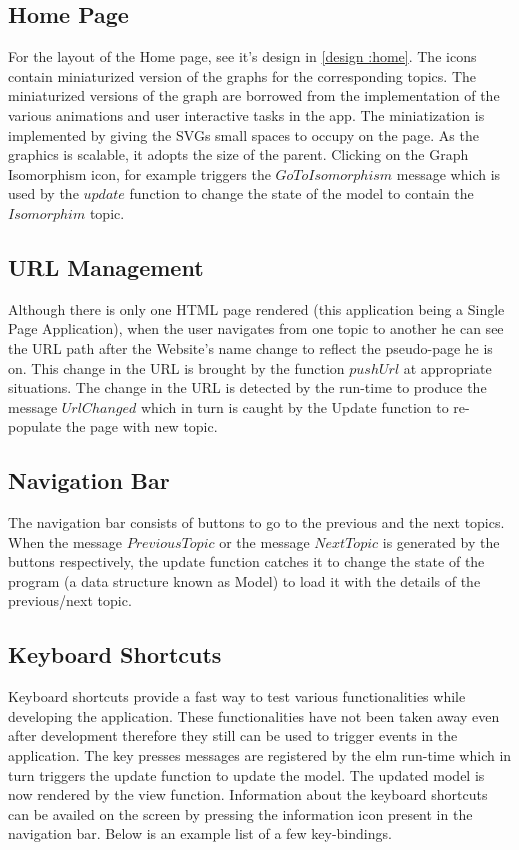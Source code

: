 \subsection{Home Page}
For the layout of the Home page, see it's design in \autoref{design :home}.
The icons contain miniaturized version of the graphs for the corresponding
topics. The miniaturized versions of the graph are borrowed from the
implementation of the various animations and user interactive tasks in the app.
The miniatization is implemented by giving the SVGs small spaces to occupy on
the page. As the graphics is scalable, it adopts the size of the parent.
Clicking on the Graph Isomorphism icon, for example triggers the
$GoToIsomorphism$ message which is used by the $update$ function to change the
state of the model to contain the $Isomorphim$ topic.


\subsection{URL Management}
Although there is only one HTML page rendered (this application being a Single
Page Application), when the user navigates from one topic to another he can see
the URL path after the Website's name change to reflect the pseudo-page he is
on. This change in the URL is brought by the function $pushUrl$ at
appropriate situations.  The change in the URL is detected by the run-time to
produce the message $UrlChanged$ which in turn is caught by the Update function
to re-populate the page with new topic.

\subsection{Navigation Bar}
The navigation bar consists of buttons to go to the previous and the next
topics.  When the message $PreviousTopic$ or the message $NextTopic$ is
generated by the buttons respectively, the update function catches it to change
the state of the program (a data structure known as Model) to load it with the
details of the previous/next topic.

\subsection{Keyboard Shortcuts}
Keyboard shortcuts provide a fast way to test various functionalities while
developing the application.  These functionalities have not been taken away
even after development therefore they still can be used to trigger events in
the application. 
The key presses messages are registered by the elm run-time which in turn
triggers the update function to update the model. The updated model is now
rendered by the view function. Information about the keyboard shortcuts can be
availed on the screen by pressing the information icon present in the
navigation bar. Below is an example list of a few key-bindings.

